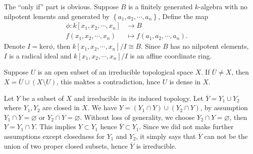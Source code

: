 \begin{solution}
  The ``only if'' part is obvious. Suppose $B$ is a finitely generated $k$-algebra with no nilpotent lements and generated by $\left\{a_1,a_2,\cdots,a_n\right\} $, Define the map
  \begin{align*}
    \phi: k[x_1,x_2,\cdots,x_n] &\longrightarrow B \\
    f(x_1,x_2,\cdots,x_n) &\longmapsto f(a_1,a_2,\cdots,a_n)
  .\end{align*}
  Denote $I=\mathrm{ker}\phi$, then $k[x_1,x_2,\cdots,x_n]/I\cong B$. Since $B$ has no nilpotent elements, $I$ is a radical ideal and $k[x_1,x_2,\cdots,x_n]/I$ is an affine coordinate ring.
\end{solution}
\begin{solution}
  Suppose $U$ is an open subset of an irreducible topological space $X$. If $\overline{U}\neq X$, then $X=\overline{U}\cup \left( X\setminus U   \right) $, this maktes a contradiction, hnce $U$ is dense in $X$. 
  
  Let $Y$ be a subset of $X$ and irreducible in its induced topology. Let $\overline{Y}=Y_1\cup Y_2$ where $Y_1,Y_2$ are closed in $X$. We have  $Y=\left( Y_1\cap Y \right) \cup \left( Y_2\cap Y \right) $, by assumption $Y_1\cap Y=\varnothing$ or $Y_2\cap Y=\varnothing$. Without loss of generality, we choose $Y_2\cap Y=\varnothing$, then $Y=Y_1\cap Y$. This implies $Y\subset Y_1$ hence $\overline{Y}\subset Y_1$. Since we did not make further assumptions except closedness for $Y_1$ and $Y_2$, it simply says that $\overline{Y}$ can not be the union of two proper closed subsets, hence $\overline{Y}$ is irreducible.
\end{solution}
